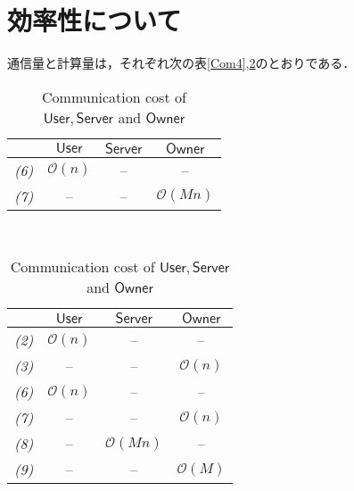 \documentclass[a4paper]{jsarticle}
\begin{document}
\section{効率性について}
通信量と計算量は，それぞれ次の表\ref{Com4},\ref{Com3}のとおりである．
\begin{table}[htb]
\begin{center}
  \begin{tabular}{|c|c|c|c|} \hline
      \backslashbox{}{}   & $\ \mathsf{User}\ $ & $\mathsf{Server}$ & $\mathsf{Owner}$ \\ \hline 
\it{(6)}& $\mathcal{O}(n)$ & -- & -- \\ \hline 
\it{(7)}& -- & -- & $\mathcal{O}(Mn)$ \\ \hline 
  \end{tabular}
  \caption{Computation cost of $\mathsf{User}, \mathsf{Server}$ and $\mathsf{Owner}$ }
  \label{Com4} %
\end{center}

 \ \ \ \ 

\begin{center}
  \begin{tabular}{|c|c|c|c|} \hline
      \backslashbox{}{}   & $\ \mathsf{User}\ $ & $\mathsf{Server}$ & $\mathsf{Owner}$ \\ \hline 
\it{(2)}& $\mathcal{O}(n)$ & -- & -- \\ \hline 
\it{(3)}& -- & -- & $\mathcal{O}(n)$ \\ \hline 
\it{(6)}& $\mathcal{O}(n)$ & -- & -- \\ \hline 
\it{(7)}& -- & -- & $\mathcal{O}(n)$ \\ \hline 
\it{(8)}& -- & $\mathcal{O}(Mn)$ & -- \\ \hline 
\it{(9)}& -- & -- & $\mathcal{O}(M)$ \\ \hline
  \end{tabular}
  \caption{Communication cost of $\mathsf{User}, \mathsf{Server}$ and $\mathsf{Owner}$ }
  \label{Com3} %
\end{center}
\end{table}
\end{document}
